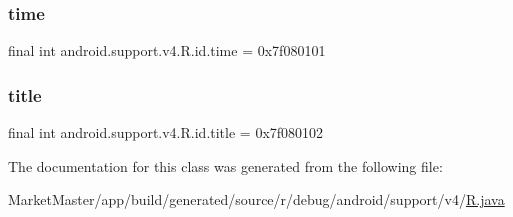 \mbox{\label{classandroid_1_1support_1_1v4_1_1R_1_1id_a30afcc3dcdbb2cea555117ae116b61a1}} 
\subsubsection{\texorpdfstring{time}{time}}
{\footnotesize\ttfamily final int android.\+support.\+v4.\+R.\+id.\+time = 0x7f080101\hspace{0.3cm}{\ttfamily [static]}}

\mbox{\label{classandroid_1_1support_1_1v4_1_1R_1_1id_a5c8aede2950c8a3ade737063d752bbda}} 
\subsubsection{\texorpdfstring{title}{title}}
{\footnotesize\ttfamily final int android.\+support.\+v4.\+R.\+id.\+title = 0x7f080102\hspace{0.3cm}{\ttfamily [static]}}



The documentation for this class was generated from the following file\+:\begin{DoxyCompactItemize}
\item 
Market\+Master/app/build/generated/source/r/debug/android/support/v4/\mbox{\hyperlink{debug_2android_2support_2v4_2R_8java}{R.\+java}}\end{DoxyCompactItemize}
